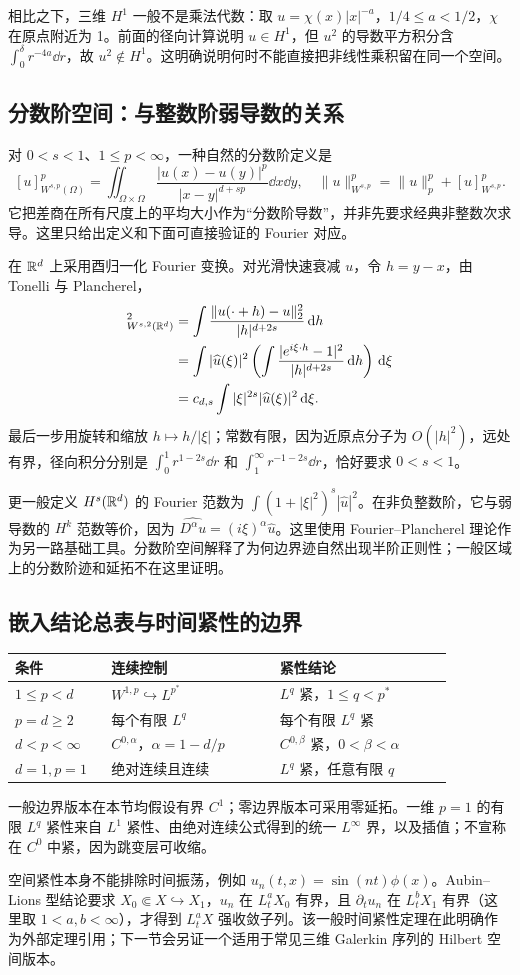 相比之下，三维 $H^1$ 一般不是乘法代数：取 $u=\chi(x)|x|^{-a}$，$1/4\le a<1/2$，$\chi$ 在原点附近为 1。前面的径向计算说明 $u\in H^1$，但 $u^2$ 的导数平方积分含 $\int_0^\delta r^{-4a}\dd r$，故 $u^2\notin H^1$。这明确说明何时不能直接把非线性乘积留在同一个空间。

\subsection{分数阶空间：与整数阶弱导数的关系}

对 $0<s<1$、$1\le p<\infty$，一种自然的分数阶定义是
\[
 [u]_{W^{s,p}(\Omega)}^p
 =\iint_{\Omega\times\Omega}\frac{|u(x)-u(y)|^p}{|x-y|^{d+sp}}\dd x\dd y,
 \quad\|u\|_{W^{s,p}}^p=\|u\|_p^p+[u]_{W^{s,p}}^p.
\]
它把差商在所有尺度上的平均大小作为“分数阶导数”，并非先要求经典非整数次求导。这里只给出定义和下面可直接验证的 Fourier 对应。

在 $\mathbb R^d$ 上采用酉归一化 Fourier 变换。对光滑快速衰减 $u$，令 $h=y-x$，由 Tonelli 与 Plancherel，
\begin{align*}
 [u]_{W^{s,2}(\R^d)}^2
 &=\int\frac{\|u(\cdot+h)-u\|_2^2}{|h|^{d+2s}}\dd h\\
 &=\int|\widehat u(\xi)|^2
       \left(\int\frac{|e^{i\xi\cdot h}-1|^2}{|h|^{d+2s}}\dd h\right)\dd\xi\\
 &=c_{d,s}\int|\xi|^{2s}|\widehat u(\xi)|^2\dd\xi.
\end{align*}
最后一步用旋转和缩放 $h\mapsto h/|\xi|$；常数有限，因为近原点分子为 $O(|h|^2)$，远处有界，径向积分分别是 $\int_0^1r^{1-2s}\dd r$ 和 $\int_1^\infty r^{-1-2s}\dd r$，恰好要求 $0<s<1$。

更一般定义 $H^s(\mathbb R^d)$ 的 Fourier 范数为 $\int(1+|\xi|^2)^s|\widehat u|^2$。在非负整数阶，它与弱导数的 $H^k$ 范数等价，因为 $\widehat{D^\alpha u}=(i\xi)^\alpha\widehat u$。这里使用 Fourier--Plancherel 理论作为另一路基础工具。分数阶空间解释了为何边界迹自然出现半阶正则性；一般区域上的分数阶迹和延拓不在这里证明。

\subsection{嵌入结论总表与时间紧性的边界}

\begin{center}\small
\begin{tabular}{p{0.18\linewidth}p{0.34\linewidth}p{0.35\linewidth}}
\toprule
条件 & 连续控制 & 紧性结论\\
\midrule
$1\le p<d$ & $W^{1,p}\hookrightarrow L^{p^*}$ & $L^q$ 紧，$1\le q<p^*$\\
$p=d\ge2$ & 每个有限 $L^q$ & 每个有限 $L^q$ 紧\\
$d<p<\infty$ & $C^{0,\alpha}$，$\alpha=1-d/p$ & $C^{0,\beta}$ 紧，$0<\beta<\alpha$\\
$d=1,p=1$ & 绝对连续且连续 & $L^q$ 紧，任意有限 $q$\\
\bottomrule
\end{tabular}
\end{center}
一般边界版本在本节均假设有界 $C^1$；零边界版本可采用零延拓。一维 $p=1$ 的有限 $L^q$ 紧性来自 $L^1$ 紧性、由绝对连续公式得到的统一 $L^\infty$ 界，以及插值；不宣称在 $C^0$ 中紧，因为跳变层可收缩。

空间紧性本身不能排除时间振荡，例如 $u_n(t,x)=\sin(nt)\phi(x)$。Aubin--Lions 型结论要求 $X_0\Subset X\hookrightarrow X_1$，$u_n$ 在 $L^a_tX_0$ 有界，且 $\partial_tu_n$ 在 $L^b_tX_1$ 有界（这里取 $1<a,b<\infty$），才得到 $L^a_tX$ 强收敛子列。该一般时间紧性定理在此明确作为外部定理引用；下一节会另证一个适用于常见三维 Galerkin 序列的 Hilbert 空间版本。
